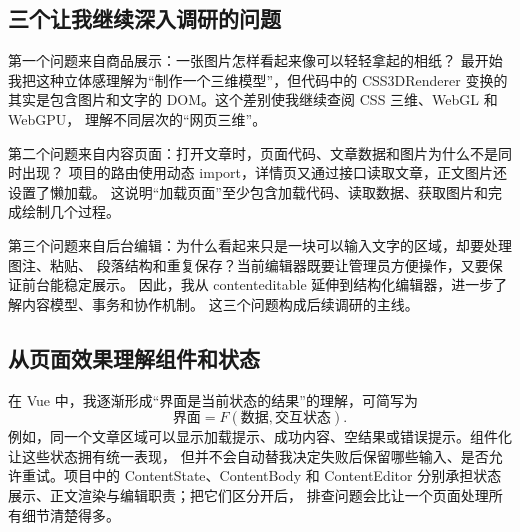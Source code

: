 \subsection{三个让我继续深入调研的问题}

第一个问题来自商品展示：一张图片怎样看起来像可以轻轻拿起的相纸？%
最开始我把这种立体感理解为“制作一个三维模型”，但代码中的 CSS3DRenderer
变换的其实是包含图片和文字的 DOM。这个差别使我继续查阅 CSS 三维、WebGL 和 WebGPU，%
理解不同层次的“网页三维”。

第二个问题来自内容页面：打开文章时，页面代码、文章数据和图片为什么不是同时出现？%
项目的路由使用动态 import，详情页又通过接口读取文章，正文图片还设置了懒加载。%
这说明“加载页面”至少包含加载代码、读取数据、获取图片和完成绘制几个过程。%


第三个问题来自后台编辑：为什么看起来只是一块可以输入文字的区域，却要处理图注、粘贴、%
段落结构和重复保存？当前编辑器既要让管理员方便操作，又要保证前台能稳定展示。%
因此，我从 contenteditable 延伸到结构化编辑器，进一步了解内容模型、事务和协作机制。%
这三个问题构成后续调研的主线。

\subsection{从页面效果理解组件和状态}
在 Vue 中，我逐渐形成“界面是当前状态的结果”的理解，可简写为
\[
\text{界面}=F(\text{数据},\text{交互状态}).
\]
例如，同一个文章区域可以显示加载提示、成功内容、空结果或错误提示。组件化让这些状态拥有统一表现，%
但并不会自动替我决定失败后保留哪些输入、是否允许重试。项目中的 ContentState、ContentBody 和
ContentEditor 分别承担状态展示、正文渲染与编辑职责；把它们区分开后，%
排查问题会比让一个页面处理所有细节清楚得多。
